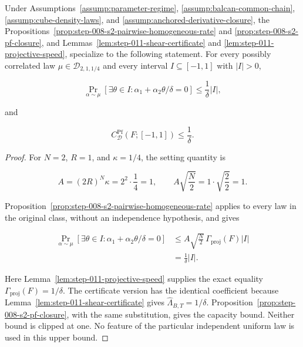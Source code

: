 \begin{proposition}
\label{prop:step-011-upper-coefficient}

Under Assumptions~\ref{assump:parameter-regime}, \ref{assump:balcan-common-chain},
\ref{assump:cube-density-laws}, and \ref{assump:anchored-derivative-closure}, the Propositions~\ref{prop:step-008-s2-pairwise-homogeneous-rate} and
\ref{prop:step-008-s2-pf-closure}, and Lemmas~\ref{lem:step-011-shear-certificate} and
\ref{lem:step-011-projective-speed}, specialize to the following statement. For every possibly correlated law
\(\mu\in\mathcal D_{2,1,1/4}\) and every interval \(I\subseteq[-1,1]\) with \(\lvert I\rvert>0\),

\begin{equation}
\label{eq:appendix-display-349}
\Pr_{\alpha\sim\mu}
[\exists\theta\in I:\alpha_1+\alpha_2\theta/\delta=0]
\leq\frac1\delta\lvert I\rvert,
\end{equation}

and

\begin{equation}
\label{eq:appendix-display-350}
C^{\mathrm{Pf}}_{\mathcal D}(F;[-1,1])\leq\frac1\delta.
\end{equation}


\end{proposition}

\begin{proof}
For \(N=2\), \(R=1\), and \(\kappa=1/4\), the setting quantity is

\begin{equation}
\label{eq:appendix-display-351}
A=(2R)^N\kappa=2^2\cdot\frac14=1,
\qquad
A\sqrt{\frac N2}=1\cdot\sqrt{\frac22}=1.
\end{equation}

Proposition~\ref{prop:step-008-s2-pairwise-homogeneous-rate} applies to every law in the original class,
without an independence hypothesis, and gives

\begin{equation}
\label{eq:appendix-display-352}
\begin{aligned}
\Pr_{\alpha\sim\mu}
[\exists\theta\in I:\alpha_1+\alpha_2\theta/\delta=0]
&\leq
A\sqrt{\frac N2}\,\Gamma_{\mathrm{proj}}(F)\lvert I\rvert\\
&=\frac1\delta\lvert I\rvert.
\end{aligned}
\end{equation}

Here Lemma~\ref{lem:step-011-projective-speed} supplies the exact equality
\(\Gamma_{\mathrm{proj}}(F)=1/\delta\). The certificate version has the identical coefficient because
Lemma~\ref{lem:step-011-shear-certificate} gives
\(\widehat\Lambda_{B,T}=1/\delta\). Proposition~\ref{prop:step-008-s2-pf-closure}, with the same substitution,
gives the capacity bound. Neither bound is clipped at one. No feature of the
particular independent uniform law is used in this upper bound. 
\end{proof}

